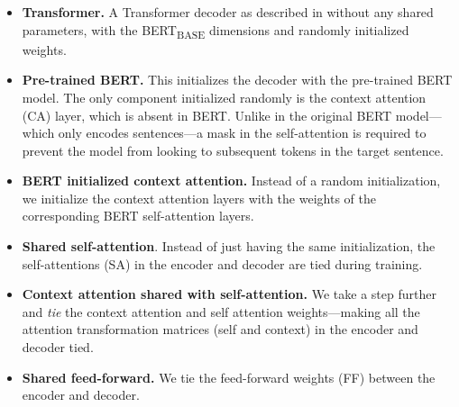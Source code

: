 \begin{itemize}
  \item \textbf{Transformer.} A Transformer decoder as described in
        \citet{vaswani2017attention} without any shared parameters,
        with the BERT\textsubscript{BASE} dimensions and randomly
        initialized weights.
  \item \textbf{Pre-trained BERT.} This initializes the decoder with
        the pre-trained BERT model. The only component initialized randomly
        is the context attention (CA) layer, which is absent in BERT. Unlike
        in the original BERT model---which only encodes sentences---a mask in
        the self-attention is required to prevent the model from looking to
        subsequent tokens in the target sentence.
  \item \textbf{ BERT initialized context attention.} Instead of a
        random initialization, we initialize the context attention layers
        with the weights of the corresponding BERT self-attention layers.
  \item \textbf{Shared self-attention}. Instead of just having the same
        initialization, the self-attentions (SA) in the encoder and decoder
        are tied during training.
  \item \textbf{Context attention shared with self-attention.} We take
        a step further and \emph{tie} the context attention and self
        attention weights---making all the attention transformation matrices
        (self and context) in the encoder and decoder tied.
  \item \textbf{Shared feed-forward.} We tie the feed-forward weights
        (FF) between the encoder and decoder.
\end{itemize}

